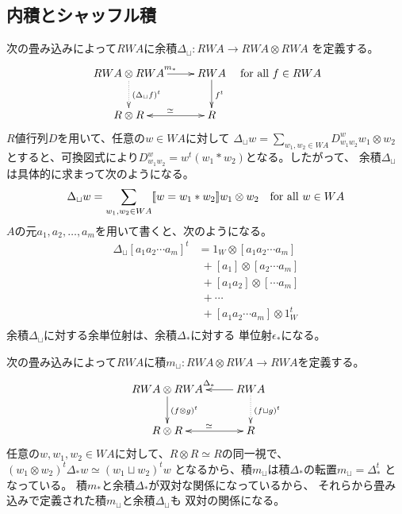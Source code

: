 	\subsection{内積とシャッフル積}\label{s2:内積とシャッフル積} %
		次の畳み込みによって$RWA$に余積$\Delta_\sqcup:RWA\to RWA\otimes RWA$
		を定義する。
		\begin{equation}\label{eq:シャッフル余積の可換図その一}\begin{split} %
			\xymatrix{
				RWA\otimes RWA \ar[r]^{m_*} \ar@{.>}[d]^{(\Delta_\sqcup f)^t} 
				& RWA \ar[d]^{f^t} \\
				R\otimes R \ar@{<->}[r]^{\simeq} & R \\
			} \quad\text{for all }f\in RWA
		\end{split}\end{equation} %
		$R$値行列$D$を用いて、任意の$w\in WA$に対して
		$\Delta_\sqcup w=\sum_{w_1,w_2\in WA}D_{w_1w_2}^ww_1\otimes w_2$
		とすると、可換図式により$D_{w_1w_2}^w=w^t(w_1*w_2)$となる。したがって、
		余積$\Delta_\sqcup$は具体的に求まって次のようになる。
		\begin{equation*}\begin{split} %
			\Delta_\sqcup w = \sum_{w_1,w_2\in WA}\jump{w=w_1*w_2}w_1\otimes w_2
			\quad\text{for all }w\in WA
		\end{split}\end{equation*} %
		$A$の元$a_1,a_2,\dots,a_m$を用いて書くと、次のようになる。
		\begin{equation*}\begin{split} %
			\Delta_\sqcup[a_1a_2\cdots a_m]^t &= 1_W\otimes [a_1a_2\cdots a_m] \\
			&\;+ [a_1]\otimes [a_2\cdots a_m] \\
			&\;+ [a_1a_2]\otimes [\cdots a_m] \\
			&\;+ \cdots \\
			&\;+ [a_1a_2\cdots a_m]\otimes 1_W^t \\
		\end{split}\end{equation*} %
		余積$\Delta_\sqcup$に対する余単位射は、余積$\Delta_*$に対する
		単位射$\epsilon_*$になる。

		次の畳み込みによって$RWA$に積$m_\sqcup:RWA\otimes RWA\to RWA$を定義する。
		\begin{equation}\label{eq:シャッフル積の可換図その一}\begin{split} %
			\xymatrix{
				RWA\otimes RWA \ar[d]^{(f\otimes g)^t} 
				& RWA \ar[l]_{\Delta_*} \ar@{.>}[d]^{(f\sqcup g)^t}\\
				R\otimes R \ar@{<->}[r]^{\simeq} & R  \\
			} 
		\end{split}\end{equation} %
		任意の$w,w_1,w_2\in WA$に対して、$R\otimes R\simeq R$の同一視で、
		$(w_1\otimes w_2)^t\Delta_*w\simeq(w_1\sqcup w_2)^tw$
		となるから、積$m_\sqcup$は積$\Delta_*$の転置$m_\sqcup=\Delta_*^t$
		となっている。
		積$m_*$と余積$\Delta_*$が双対な関係になっているから、
		それらから畳み込みで定義された積$m_\sqcup$と余積$\Delta_\sqcup$も
		双対の関係になる。


